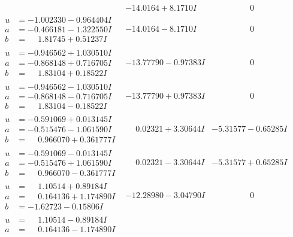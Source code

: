 \documentclass[1p]{elsarticle_modified}
\theoremstyle{definition}
\begin{document}
$$\begin{array}{c|c|c}
 & -14.0164 + 8.1710 I & \phantom{-0.000000 } 0 \\ \hline\begin{aligned}
u &= -1.002330 - 0.964404 I \\
a &= -0.466181 - 1.322550 I \\
b &= \phantom{-}1.81745 + 0.51237 I\end{aligned}
 & -14.0164 - 8.1710 I & \phantom{-0.000000 } 0 \\ \hline\begin{aligned}
u &= -0.946562 + 1.030510 I \\
a &= -0.868148 + 0.716705 I \\
b &= \phantom{-}1.83104 + 0.18522 I\end{aligned}
 & -13.77790 - 0.97383 I & \phantom{-0.000000 } 0 \\ \hline\begin{aligned}
u &= -0.946562 - 1.030510 I \\
a &= -0.868148 - 0.716705 I \\
b &= \phantom{-}1.83104 - 0.18522 I\end{aligned}
 & -13.77790 + 0.97383 I & \phantom{-0.000000 } 0 \\ \hline\begin{aligned}
u &= -0.591069 + 0.013145 I \\
a &= -0.515476 - 1.061590 I \\
b &= \phantom{-}0.966070 + 0.361777 I\end{aligned}
 & \phantom{-}0.02321 + 3.30644 I & -5.31577 - 0.65285 I \\ \hline\begin{aligned}
u &= -0.591069 - 0.013145 I \\
a &= -0.515476 + 1.061590 I \\
b &= \phantom{-}0.966070 - 0.361777 I\end{aligned}
 & \phantom{-}0.02321 - 3.30644 I & -5.31577 + 0.65285 I \\ \hline\begin{aligned}
u &= \phantom{-}1.10514 + 0.89184 I \\
a &= \phantom{-}0.164136 + 1.174890 I \\
b &= -1.62723 - 0.15806 I\end{aligned}
 & -12.28980 - 3.04790 I & \phantom{-0.000000 } 0 \\ \hline\begin{aligned}
u &= \phantom{-}1.10514 - 0.89184 I \\
a &= \phantom{-}0.164136 - 1.174890 I \\

\end{aligned}
\end{array}$$
\end{document}
